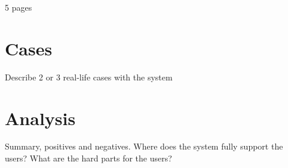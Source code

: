 5 pages

\section{Cases}
Describe 2 or 3 real-life cases with the system

\section{Analysis}
Summary, positives and negatives. Where does the system fully support the users? What are the hard parts for the users?